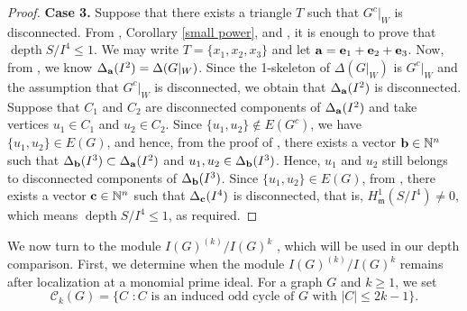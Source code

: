 \documentclass[12pt]{amsart}
\theoremstyle{definition}
\theoremstyle{remark}
\DeclareMathOperator{\depth}{depth}
\begin{document}
\begin{proof}
{\bf Case 3.} Suppose that there exists a triangle $T$ such that $G^{c}|_{W}$ is disconnected. From \cite[Theorem 4.4]{hlt2023}, Corollary \ref{small power}, and \cite[Theorem 2.15]{mmv2012}, it is enough to prove that $\depth S/I^{4}\leq1$. We may write $T=\{x_{1},x_{2},x_{3}\}$ and let ${\bf a}={\bf e}_{1}+{\bf e}_{2}+{\bf e}_{3}$. Now, from \cite[Lemma 4.7]{tt2014}, we know $\Delta_{\bf a}(I^{2})=\Delta(G|_{W})$. Since the 1-skeleton of $\Delta(G|_{W})$ is $G^{c}|_{W}$ and the assumption that $G^{c}|_{W}$ is disconnected, we obtain that $\Delta_{\bf a}(I^{2})$ is disconnected. Suppose that $C_{1}$ and $C_{2}$ are disconnected components of $\Delta_{\bf a}(I^{2})$ and take vertices $u_{1}\in C_{1}$ and $u_{2}\in C_{2}$. Since $\{u_{1},u_{2}\}\notin E(G^{c})$, we have $\{u_{1},u_{2}\}\in E(G)$, and hence, from  the proof of \cite[Proposition 3.2]{hlt2023}, there exists a vector ${\bf b}\in\mathbb{N}^{n}$ such that $\Delta_{\bf b}(I^{3})\subset\Delta_{\bf a}(I^{2})$ and $u_{1},u_{2}\in\Delta_{\bf b}(I^{3})$. Hence, $u_{1}$ and $u_{2}$ still belongs to disconnected components of $\Delta_{\bf b}(I^{3})$. Since $\{u_{1},u_{2}\}\in E(G)$, from \cite[Proposition 3.2]{hlt2023}, there exists a vector ${\bf c}\in\mathbb{N}^{n}$ such that $\Delta_{\bf c}(I^{4})$ is disconnected, that is, $H_{\mathfrak{m}}^{1}(S/I^{4})\neq0$, which means $\depth S/I^{4}\leq1$, as required. 
\end{proof}

We now turn to the module $I(G)^{(k)}/I(G)^{k}$ , which will be used in our depth comparison. First, we determine when the module $I(G)^{(k)}/I(G)^{k}$ remains after localization at a monomial prime ideal. For a graph $G$ and $k\geq1$, we set 
$$\mathcal{C}_{k}(G)=\{C\,\,: C\mbox{ is an induced odd cycle of }G\mbox{ with }|C|\leq 2k-1\}.$$
\end{document}
